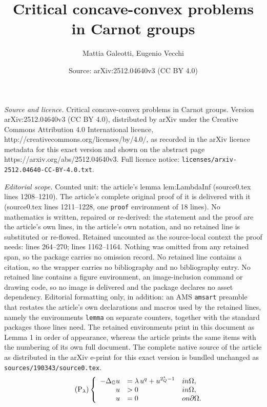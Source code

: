 \documentclass[10pt,a4paper]{amsart}
\title{Critical concave-convex problems in Carnot groups}
\author{Mattia Galeotti, Eugenio Vecchi}
\date{Source: arXiv:2512.04640v3 (CC BY 4.0)}
\begin{document}
\maketitle

\noindent\emph{Source and licence.} Critical concave-convex problems in Carnot groups. Version arXiv:2512.04640v3 (CC BY 4.0), distributed by arXiv under the Creative Commons Attribution 4.0 International licence, http://creativecommons.org/licenses/by/4.0/, as recorded in the arXiv licence metadata for this exact version and shown on the abstract page https://arxiv.org/abs/2512.04640v3. Full licence notice: \texttt{licenses/arxiv-2512.04640-CC-BY-4.0.txt}.\par\smallskip

\noindent\textit{Editorial scope.} Counted unit: the article's lemma lem:LambdaInf (source0.tex lines 1208--1210). The article's complete original proof of it is delivered with it (source0.tex lines 1211--1228, one \texttt{proof} environment of 18 lines). No mathematics is written, repaired or re-derived: the statement and the proof are the article's own lines, in the article's own notation, and no retained line is substituted or re-flowed.  Retained uncounted as the source-local context the proof needs: lines 264--270; lines 1162--1164.  Nothing was omitted from any retained span, so the package carries no omission record.  No retained line contains a citation, so the wrapper carries no bibliography and no bibliography entry.  No retained line contains a figure environment, an image-inclusion command or drawing code, so no image is delivered and the package declares no asset dependency.  Editorial formatting only, in addition: an AMS \texttt{amsart} preamble that restates the article's own declarations and macros used by the retained lines, namely the environments \texttt{lemma} on separate counters, together with the standard packages those lines need.  The retained environments print in this document as Lemma 1 in order of appearance, whereas the article prints the same items with the numbering of its own full document.  The complete native source of the article as distributed in the arXiv e-print for this exact version is bundled unchanged as \texttt{sources/190343/source0.tex}.
\begin{equation}\tag{{$\mathrm{P}_{\lambda}$}}\label{EqProblem}
	\left\{\begin{array}{rll}
		-\Delta_{\mathbb{G}}u& = \lambda\, u^{q} + u^{2^{\star}_{Q}-1} & \textrm{ in } \Omega,\\
		u&>0 & \textrm{ in } \Omega,\\
		u&=0 & \textrm{ on } \partial \Omega.
	\end{array}\right.
\end{equation}
\end{document}
